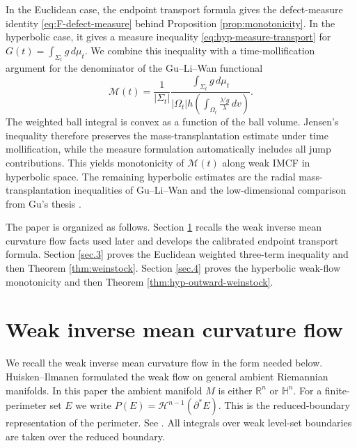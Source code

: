 \documentclass[11pt,reqno]{amsart}
\numberwithin{equation}{section}
\theoremstyle{definition}
\newcommand{\R}{\mathbb R}
\newcommand{\calH}{\mathcal H}
\newcommand{\HH}{\mathbb H}
\begin{document}
In the Euclidean case, the endpoint transport formula gives the defect-measure identity \eqref{eq:F-defect-measure} behind Proposition \ref{prop:monotonicity}.  In the hyperbolic case, it gives a measure inequality \eqref{eq:hyp-measure-transport} for $G(t)=\int_{\Sigma_t}g\,d\mu_t$.  We combine this inequality with a time-mollification argument for the denominator of the Gu--Li--Wan \cite{GuLiWan2025} functional
\begin{equation}\label{s1.Mt}
    \mathcal M(t)=\frac{1}{|\Sigma_t|}
    \frac{\int_{\Sigma_t}g\,d\mu_t}
        {|\Omega_t|h(\int_{\Omega_t}\frac{\lambda'g}{\lambda}\,dv)}.
\end{equation}
The weighted ball integral is convex as a function of the ball volume. Jensen's inequality therefore preserves the mass-transplantation estimate under time mollification, while the
measure formulation automatically includes all jump contributions. This yields monotonicity of $ \mathcal M(t)$ along weak IMCF in hyperbolic space. The remaining hyperbolic estimates are the radial mass-transplantation inequalities of Gu--Li--Wan \cite{GuLiWan2025} and the low-dimensional comparison from Gu's thesis \cite{GuThesis2026}.


The paper is organized as follows.  Section \ref{sec.2} recalls the weak inverse mean curvature flow facts used later and develops the calibrated endpoint transport formula.  Section \ref{sec.3} proves the Euclidean weighted three-term inequality and then Theorem \ref{thm:weinstock}.  Section \ref{sec.4} proves the hyperbolic weak-flow monotonicity and then Theorem \ref{thm:hyp-outward-weinstock}.

\section{Weak inverse mean curvature flow}\label{sec.2}

We recall the weak inverse mean curvature flow in the form needed below.  Huisken--Ilmanen \cite{HI2001} formulated the weak flow on general ambient Riemannian manifolds.  In this paper the ambient manifold $M$ is either $\R^n$ or $\HH^n$.  For a finite-perimeter set $E$ we write $P(E)=\calH^{n-1}(\partial^*E)$. This is the reduced-boundary representation of the perimeter.  See \cite[Theorem~15.9]{Maggi2012}.  All integrals over weak level-set boundaries are taken over the reduced boundary.
\end{document}
